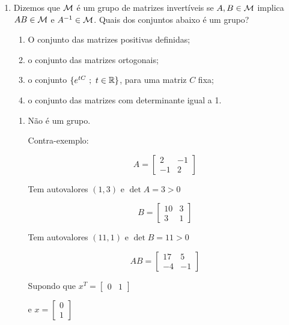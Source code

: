 \documentclass[leqno]{article}
\numberwithin{equation}{section}
\begin{document}
\begin{enumerate}
		\item Dizemos que $\mathcal{M}$ é um grupo de matrizes invertíveis se $A, B \in \mathcal{M}$ implica $AB \in \mathcal{M}$ e $A^{-1} \in \mathcal{M}$. Quais dos conjuntos abaixo é um grupo?  
		
		\begin{enumerate}
			
			\item O conjunto das matrizes positivas definidas;
			
			\item o conjunto das matrizes ortogonais;
			
			\item o conjunto $\{e^{tC} \ ; \ t \in \mathbb{R}\}$, para uma matriz $C$ fixa;
			
			\item o conjunto das matrizes com determinante igual a 1.
			
		\end{enumerate}
		
		\begin{sol} 
			\vspace{-\baselineskip}  
			\begin{enumerate} 
				\item Não é um grupo.
				
				Contra-exemplo:
				
				$$A = \begin{bmatrix}
					2 & -1 \\
					-1 & 2
				\end{bmatrix}$$
				
					Tem autovalores $(1, 3)$ e $\det{A} = 3 > 0$
				
				$$B = \begin{bmatrix}
					10 & 3 \\
					3 & 1
				\end{bmatrix}$$
			
				Tem autovalores $(11, 1)$ e $\det{B} = 11 > 0$
				
				$$AB = \begin{bmatrix}
					17 & 5 \\
					-4 & -1
				\end{bmatrix}$$
			
				Supondo que $x^T = \begin{bmatrix}
					0 & 1
				\end{bmatrix}$ 
			
				e $x = \begin{bmatrix}
					0 \\
					1
				\end{bmatrix}$
			

\end{enumerate}
\end{sol}
\end{enumerate}
\end{document}
